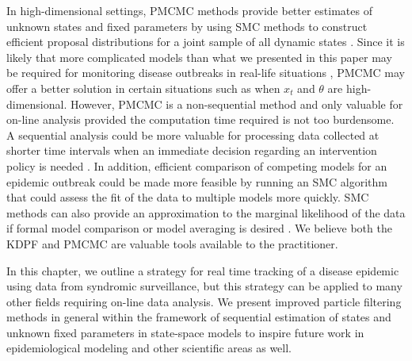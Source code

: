 In high-dimensional settings, PMCMC methods provide better estimates of unknown states and fixed parameters by using SMC methods to construct efficient proposal distributions for a joint sample of all dynamic states \citep{Andr:Douc:Hol:pmcmc:2010}. Since it is likely that more complicated models than what we presented in this paper may be required for monitoring disease outbreaks in real-life situations \citep{Sham:Kars:pnas:2012, Bhad:Ioni:mala:2011}, PMCMC may offer a better solution in certain situations such as when $x_t$ and $\theta$ are high-dimensional. However, PMCMC is a non-sequential method and only valuable for on-line analysis provided the computation time required is not too burdensome. A sequential analysis could be more valuable for processing data collected at shorter time intervals when an immediate decision regarding an intervention policy is needed \citep{Merl:John:Gram:Mang:stat:2008, ludkovski2010optimal, dukic2012tracking}. In addition, efficient comparison of competing models for an epidemic outbreak \citep{Bhad:Ioni:mala:2011} could be made more feasible by running an SMC algorithm that could assess the fit of the data to multiple models more quickly. SMC methods can also provide an approximation to the marginal likelihood of the data if formal model comparison or model averaging is desired \citep{douc:joh:tut:2009, zhou:joh:smcmodcomp:2013}. We believe both the KDPF and PMCMC are valuable tools available to the practitioner.

In this chapter, we outline a strategy for real time tracking of a disease epidemic using data from syndromic surveillance, but this strategy can be applied to many other fields requiring on-line data analysis. We present improved particle filtering methods in general within the framework of sequential estimation of states and unknown fixed parameters in state-space models to inspire future work in epidemiological modeling and other scientific areas as well. 